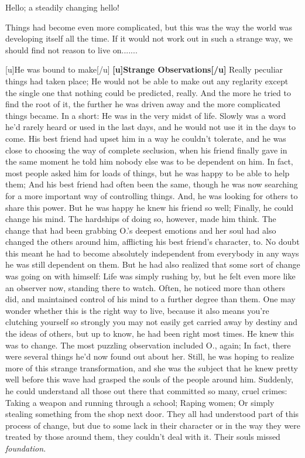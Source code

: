 Hello; a steadily changing hello! 

Things had become even more complicated, but this was the way the world was developing itself all the time. If it would not work out in such a strange way, we should find not reason to live on....... 

[u]He was bound to make[/u]
\textbf{[u]Strange Observations[/u]}
Really peculiar things had taken place; He would not be able to make out any reglarity except the single one that nothing could be predicted, really. And the more he tried to find the root of it, the further he was driven away and the more complicated things became. In a short: He was in the very midst of life. 
Slowly was a word he'd rarely heard or used in the last days, and he would not use it in the days to come. His best friend had upset him in a way he couldn't tolerate, and he was close to choosing the way of complete seclusion, when his friend finally gave in the same moment he told him nobody else was to be dependent on him. In fact, most people asked him for loads of things, but he was happy to be able to help them; And his best friend had often been the same, though he was now searching for a more important way of controlling things. 
And, he was looking for others to share this power. 
But he was happy he knew his friend so well; Finally, he could change his mind. The hardships of doing so, however, made him think. The change that had been grabbing O.'s deepest emotions and her soul had also changed the others around him, afflicting his best friend's character, to. No doubt this meant he had to become absolutely independent from everybody in any ways he was still dependent on them. 
But he had also realized that some sort of change was going on with himself: Life was simply rushing by, but he felt even more like an observer now, standing there to watch. Often, he noticed more than others did, and maintained control of his mind to a further degree than them. One may wonder whether this is the right way to live, because it also means you're clutching yourself so strongly you may not easily get carried away by destiny and the ideas of others, but up to know, he had been right most times. 
He knew this was to change. 
The most puzzling observation included O., again; In fact, there were several things he'd now found out about her. Still, he was hoping to realize more of this strange transformation, and she was the subject that he knew pretty well before this wave had grasped the souls of the people around him. 
Suddenly, he could understand all those out there that committed so many, cruel crimes: Taking a weapon and running through a school; Raping women; Or simply stealing something from the shop next door. They all had understood part of this process of change, but due to some lack in their character or in the way they were treated by those around them, they couldn't deal with it. Their souls missed \emph{foundation}. 
